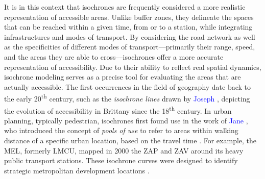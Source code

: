 \begin{refsegment}
It is in this context that isochrones are frequently considered a more realistic representation of accessible areas. Unlike buffer zones, they delineate the spaces that can be reached within a given time, from or to a station, while integrating infrastructures and modes of transport. By considering the road network as well as the specificities of different modes of transport—primarily their range, speed, and the areas they are able to cross—isochrones offer a more accurate representation of accessibility. Due to their ability to reflect real spatial dynamics, isochrone modeling serves as a precise tool for evaluating the areas that are actually accessible. The first occurrences in the field of geography date back to the early 20\textsuperscript{th} century, such as the \textsl{isochrone lines} drawn by \textcolor{blue}{Joseph} \textcolor{blue}{\textcite[311-314]{letaconnoux_note_1907}}, depicting the evolution of accessibility in Brittany since the 18\textsuperscript{th} century. In urban planning, typically pedestrian, isochrones first found use in the work of \textcolor{blue}{Jane} \textcolor{blue}{\textcite[179-182]{jacobs_death_1961}}, who introduced the concept of \textsl{pools of use} to refer to areas within walking distance of a specific urban location, based on the travel time \textcolor{blue}{\autocite[3]{dovey_isochrone_2017}}. For example, the \acrfull{MEL}, formerly \acrfull{LMCU}, mapped in 2000 the \acrfull{ZAP} and \acrfull{ZAV} around its heavy public transport stations. These isochrone curves were designed to identify strategic metropolitan development locations \textcolor{blue}{\autocite[9]{heran_zones_2009}}.%


\end{refsegment}

